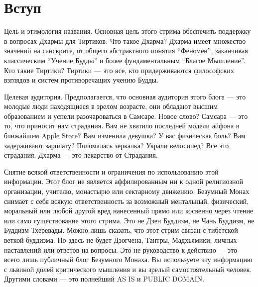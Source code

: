 \section{Вступ}

Цель и этимология названия. Основная цель этого стрима обеспечить поддержку в вопросах Дхармы для Тиртиков. Что такое Дхарма? Дхарма имеет множество значений на санскрите, от общего абстрактного понятия “Феномен”, заканчивая классическим “Учение Будды” и более фундаментальным “Благое Мышление”. Кто такие Тиртики? Тиртики — это все, кто придерживаются философских взглядов и систем противоречащих учению Будды. 

Целевая аудитория. Предполагается, что основная аудитория этого блога — это молодые люди находящиеся в зрелом возрасте, они обладают высшим образованием и успели разочароваться в Самсаре. Новое слово? Самсара — это то, что приносит нам страдания. Вам не хватило последней модели айфона в ближайшем Apple Store? Вам изменила девушка? У вас физическая боль? Вам задерживают зарплату? Поломалась зеркалка? Украли велосипед? Все это страдания. Дхарма — это лекарство от Страдания.

Снятие всякой ответственности и ограничения по использованию этой информации. Этот блог не является аффилированным ни к одной религиозной организации, учителю, монастырю или сектарному движению. Безумный Монах снимает с себя всякую ответственность за возможный ментальный, физический, моральный или любой другой вред нанесенный прямо или косвенно через чтение или само существование этого стрима.  Это не Дзен Буддизм, не Чань Буддизм, не Буддизм Тхеревады. Можно лишь сказать, что этот стрим связан с тибетской веткой буддизма. Но здесь не будет Дзогчена, Тантры, Мадхьямики, личных наставлений или ответов на вопросы. Это не руководство к действию — это всего лишь публичный блог Безумного Монаха. Вы используете эту информацию с львиной долей критического мышления и вы зрелый самостоятельный человек. Другими словами — это полнейший AS IS и PUBLIC DOMAIN.
